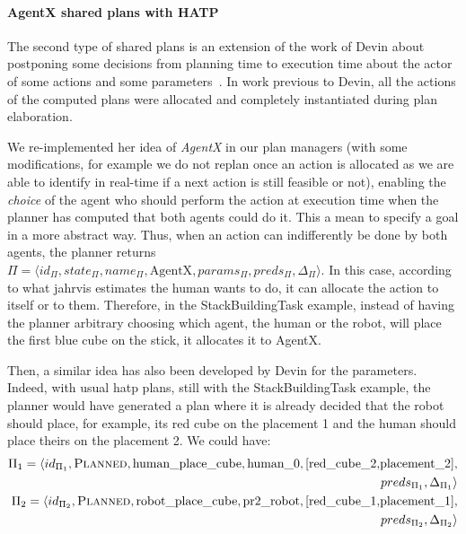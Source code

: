 \documentclass[a4paper,11pt,twoside]{StyleThese}
\begin{document}
\paragraph{AgentX shared plans with HATP}
The second type of shared plans is an extension of the work of Devin about postponing some decisions from planning time to execution time about the actor of some actions and some parameters~\citep{devin_2017_decisions}. In work previous to Devin, all the actions of the computed plans were allocated and completely instantiated during plan elaboration. 

We re-implemented her idea of \emph{AgentX} in our plan managers (with some modifications, for example we do not replan once an action is allocated as we are able to identify in real-time if a next action is still feasible or not), enabling the \emph{choice} of the agent who should perform the action at execution time when the planner has computed that both agents could do it. This a mean to specify a goal in a more abstract way. Thus, when an action can indifferently be done by both agents, the planner returns  $\Pi=\langle id_\Pi,state_\Pi,name_\Pi,\text{AgentX},params_\Pi,preds_\Pi,\Delta_\Pi\rangle$. In this case, according to what \acrshort{jahrvis} estimates the human wants to do, it can allocate the action to itself or to them. Therefore, in the StackBuildingTask example, instead of having the planner arbitrary choosing which agent, the human or the robot, will place the first blue cube on the stick, it allocates it to AgentX.
\thispagestyle{example}

Then, a similar idea has also been developed by Devin for the parameters. Indeed, with usual \acrshort{hatp} plans, still with the StackBuildingTask example, the planner would have generated a plan where it is already decided that the robot should place, for example, its red cube on the placement 1 and the human should place theirs on the placement 2. We could have:
\begin{align*}
	\Pi_1=\langle id_{\Pi_1},\textsc{Planned},\text{human\_place\_cube},\text{human\_0}, [\text{red\_cube\_2,placement\_2}],&\\ preds_{\Pi_1},\Delta_{\Pi_1}\rangle&\\
	\Pi_2=\langle id_{\Pi_2},\textsc{Planned},\text{robot\_place\_cube},\text{pr2\_robot}, [\text{red\_cube\_1,placement\_1}],&\\ preds_{\Pi_2},\Delta_{\Pi_2}\rangle&
\end{align*}
  
\end{document}
